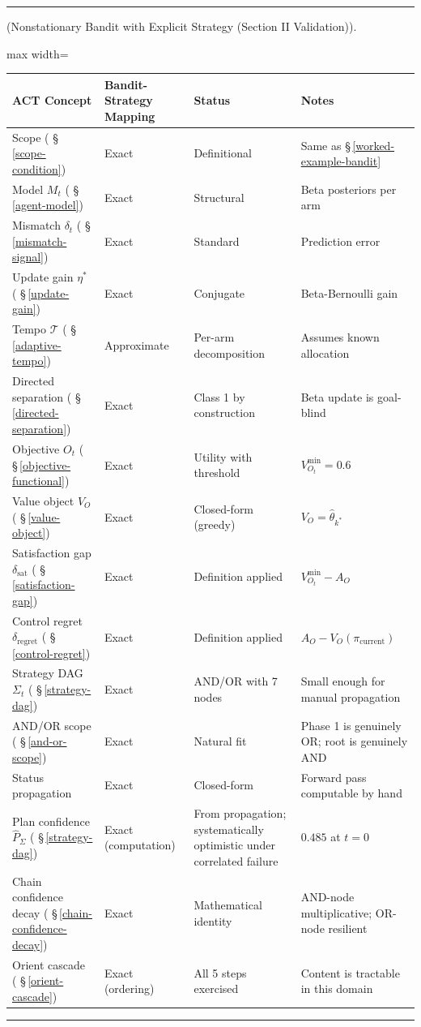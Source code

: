 \documentclass[11pt,oneside]{article}
\newcounter{claim}[section]
\renewcommand{\theclaim}{\thesection.\arabic{claim}}
\newenvironment{segment}[2]{%
  \refstepcounter{claim}%
  \bigskip\noindent\hrule\smallskip
  \noindent{\bfseries #1~\theclaim}\enskip(#2).\par\smallskip
  \noindent\ignorespaces
}{%
  \par\smallskip\noindent\hrule\bigskip
}
\newenvironment{remark}[1][]{\begin{segment}{Remark}{#1}}{\end{segment}}
\begin{document}
\begin{remark}[Nonstationary Bandit with Explicit Strategy (Section II Validation)]
\begin{adjustbox}{max width=\textwidth}
\small
\begin{tabular}{llll}
\toprule
ACT Concept & Bandit-Strategy Mapping & Status & Notes \\
\midrule
Scope ( \S\,\ref{scope-condition}) & Exact & Definitional & Same as \S\,\ref{worked-example-bandit} \\
Model $M_t$ ( \S\,\ref{agent-model}) & Exact & Structural & Beta posteriors per arm \\
Mismatch $\delta_t$ ( \S\,\ref{mismatch-signal}) & Exact & Standard & Prediction error \\
Update gain $\eta^*$ ( \S\,\ref{update-gain}) & Exact & Conjugate & Beta-Bernoulli gain \\
Tempo $\mathcal{T}$ ( \S\,\ref{adaptive-tempo}) & Approximate & Per-arm decomposition & Assumes known allocation \\
Directed separation ( \S\,\ref{directed-separation}) & Exact & Class 1 by construction & Beta update is goal-blind \\
Objective $O_t$ ( \S\,\ref{objective-functional}) & Exact & Utility with threshold & $V_{O_t}^{\min} = 0.6$ \\
Value object $V_O$ ( \S\,\ref{value-object}) & Exact & Closed-form (greedy) & $V_O = \hat\theta_{k^*}$ \\
Satisfaction gap $\delta_\text{sat}$ ( \S\,\ref{satisfaction-gap}) & Exact & Definition applied & $V_{O_t}^{\min} - A_O$ \\
Control regret $\delta_\text{regret}$ ( \S\,\ref{control-regret}) & Exact & Definition applied & $A_O - V_O(\pi_\text{current})$ \\
Strategy DAG $\Sigma_t$ ( \S\,\ref{strategy-dag}) & Exact & AND/OR with 7 nodes & Small enough for manual propagation \\
AND/OR scope ( \S\,\ref{and-or-scope}) & Exact & Natural fit & Phase 1 is genuinely OR; root is genuinely AND \\
Status propagation & Exact & Closed-form & Forward pass computable by hand \\
Plan confidence $\hat P_\Sigma$ ( \S\,\ref{strategy-dag}) & Exact (computation) & From propagation; systematically optimistic under correlated failure & $0.485$ at $t = 0$ \\
Chain confidence decay ( \S\,\ref{chain-confidence-decay}) & Exact & Mathematical identity & AND-node multiplicative; OR-node resilient \\
Orient cascade ( \S\,\ref{orient-cascade}) & Exact (ordering) & All 5 steps exercised & Content is tractable in this domain \\

\end{tabular}
\end{adjustbox}
\end{remark}
\end{document}
